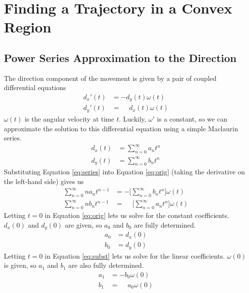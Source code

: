 \documentclass{report}
\begin{document}

\chapter{Finding a Trajectory in a Convex Region}
\section{Power Series Approximation to the Direction}
The direction component of the movement is given by a pair of
coupled differential equations
\begin{equation} \label{eq:orig}
    \begin{aligned}
    d_x'(t) &= -d_y(t)\omega(t)\\
    d_y'(t) &= \phantom{-}d_x(t)\omega(t)
    \end{aligned}
\end{equation}
$\omega(t)$ is the angular velocity at time $t$. Luckily,
$\omega'$ is a constant, so we can approximate
the solution to this differential equation using a simple Maclaurin series.
\begin{equation} \label{eq:series}
    \begin{aligned}
    d_x(t) &= \sum_{n=0}^\infty a_n t^n \\
    d_y(t) &= \sum_{n=0}^\infty b_n t^n
    \end{aligned}
\end{equation}
Substituting Equation \ref{eq:series} into Equation \ref{eq:orig}
(taking the derivative on the left-hand side) gives us
\begin{equation} \label{eq:subst}
    \begin{aligned}
    \sum_{n=0}^\infty n a_n t^{n-1} &=
        -\Bigg[\sum_{n=0}^\infty b_n t^n \Bigg]
        \omega(t) \\
    \sum_{n=0}^\infty n b_n t^{n-1} &=
        \phantom{-}\Bigg[\sum_{n=0}^\infty a_n t^n \Bigg]
        \omega(t)
    \end{aligned}
\end{equation}
Letting $t=0$ in Equation \ref{eq:orig} lets us solve for the constant coefficients. $d_x(0)$ and $d_y(0)$ are given,
so $a_0$ and $b_0$ are fully determined.
\begin{equation} \label{eq:coeff0}
    \begin{aligned}
        a_0 &= d_x(0) \\
        b_0 &= d_y(0)
    \end{aligned}
\end{equation}
Letting $t=0$ in
Equation \ref{eq:subst} lets us solve for the linear coefficients. $\omega(0)$ is given, so $a_1$ and $b_1$ are also
fully determined.
\begin{equation} \label{eq:coeff1}
    \begin{aligned}
    a_1 &= -b_0\omega(0) \\
    b_1 &= \phantom{-}a_0\omega(0)
    \end{aligned}
\end{equation}
\end{document}
